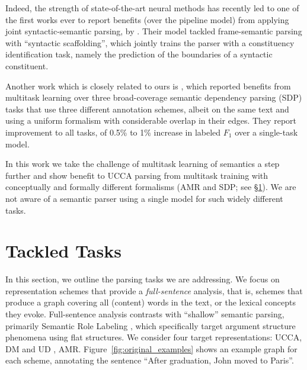 \documentclass[11pt,a4paper]{article}
\begin{document}
Indeed, the strength of state-of-the-art neural methods has recently led to 
one of the first works ever to report benefits (over the pipeline model) from 
applying joint syntactic-semantic parsing, by \citet{swayamdipta2017frame}.
Their model tackled frame-semantic parsing with ``syntactic scaffolding'',
which jointly trains the parser with a constituency identification task, 
namely the prediction of the boundaries of a syntactic
constituent. 

Another work which is closely related to ours is \citet{P17-1186},
which reported benefits from multitask learning over three broad-coverage semantic dependency parsing (SDP)
tasks that use three different annotation schemes, albeit on the same text and using a uniform formalism with 
considerable overlap in their edges.
They report improvement to all tasks, of 0.5\% to 1\% increase in labeled $F_1$ over a single-task model.

In this work we take the challenge of multitask learning of semantics a step further and 
show benefit to UCCA parsing from multitask 
training with conceptually and formally different formalisms (AMR and SDP; see \S\ref{sec:tasks}).
We are not aware of a semantic parser using a single model for
such widely different tasks.




\section{Tackled Tasks}\label{sec:tasks}

In this section, we outline the parsing tasks we are addressing.
We focus on representation schemes that provide a \textit{full-sentence} analysis,
that is, schemes that produce a graph covering all (content) words in the text, or the
lexical concepts they evoke.
Full-sentence analysis contrasts with ``shallow'' semantic parsing,
primarily Semantic Role Labeling
\cite[SRL;][]{Palmer:05,gildea2002automatic,swayamdipta2017frame,ringgaard2017sling},
which specifically target argument structure phenomena using flat structures.
We consider four target representations: UCCA, DM and UD
\cite[Universal Dependencies; ][]{nivre2016universal}, AMR.
Figure~\ref{fig:original_examples} shows an example graph for each scheme,
annotating the sentence ``After graduation, John moved to Paris''.
\end{document}
